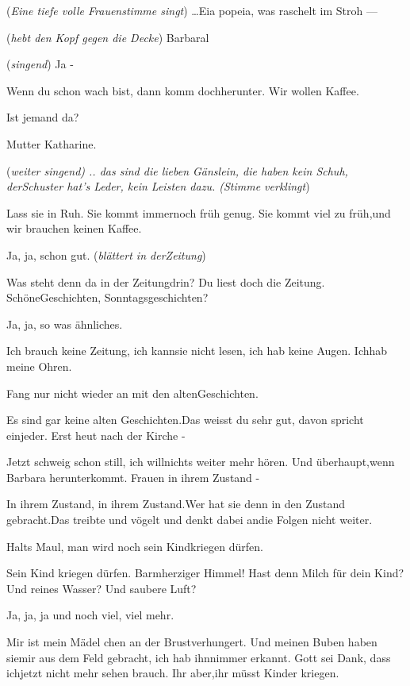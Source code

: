 \documentclass[
	final,
	a4paper,
	ngerman,
	mpinclude = true, %
	twoside = true,
	open = right,
	cleardoublepage = plain,
	DIV = 13,
	BCOR = 1cm,
	titlepage = firstiscover,
	]{scrbook}
\newcommand{\direction}[1]{(\textit{#1})}
\newcommand{\thecharacter}[1]{\textup{\textsc{#1}}\xspace}
\newcommand{\theBarbara}{\thecharacter{Barbara}}
\newcommand{\theJosef}{\thecharacter{Josef}}
\newcommand{\theKathrine}{\thecharacter{Kathrine}}
\newcommand{\character}[1]{\item[#1]}
\newcommand{\Barbara}{\character{\theBarbara}}
\newcommand{\Josef}{\character{\theJosef}}
\newcommand{\Kathrine}{\character{\theKathrine}}
\begin{document}
\begin{play}

\Barbara
\direction{Eine tiefe volle Frauenstimme singt} \ldots Eia popeia, was raschelt im Stroh ---

\Josef
\direction{hebt den Kopf gegen die Decke} Barbaral

\Barbara
\direction{singend} Ja -

\Josef
Wenn du schon wach bist, dann komm dochherunter. Wir wollen Kaffee.

\Barbara
Ist jemand da?

\Josef
Mutter Katharine.

\Barbara
\direction{weiter singend) .. das sind die lieben Gänslein, die haben kein Schuh, derSchuster hat's Leder, kein Leisten dazu. (Stimme verklingt}

\Kathrine
Lass sie in Ruh. Sie kommt immernoch früh genug. Sie kommt viel zu früh,und wir brauchen keinen Kaffee.

\Josef
Ja, ja, schon gut. \direction{blättert in derZeitung}

\Kathrine
Was steht denn da in der Zeitungdrin? Du liest doch die Zeitung. SchöneGeschichten, Sonntagsgeschichten?

\Josef
Ja, ja, so was ähnliches.

\Kathrine
Ich brauch keine Zeitung, ich kannsie nicht lesen, ich hab keine Augen. Ichhab meine Ohren.

\Josef
Fang nur nicht wieder an mit den altenGeschichten.

\Kathrine
Es sind gar keine alten Geschichten.Das weisst du sehr gut, davon spricht einjeder. Erst heut nach der Kirche -

\Josef
Jetzt schweig schon still, ich willnichts weiter mehr hören. Und überhaupt,wenn Barbara herunterkommt. Frauen in ihrem Zustand -

\Kathrine
In ihrem Zustand, in ihrem Zustand.Wer hat sie denn in den Zustand gebracht.Das treibte und vögelt und denkt dabei andie Folgen nicht weiter.

\Josef
Halts Maul, man wird noch sein Kindkriegen dürfen.

\Kathrine
Sein Kind kriegen dürfen. Barmherziger Himmel! Hast denn Milch für dein Kind?Und reines Wasser? Und saubere Luft?

\Josef
Ja, ja, ja und noch viel, viel mehr.

\Kathrine
Mir ist mein Mädel chen an der Brustverhungert. Und meinen Buben haben siemir aus dem Feld gebracht, ich hab ihnnimmer erkannt. Gott sei Dank, dass ichjetzt nicht mehr sehen brauch. Ihr aber,ihr müsst Kinder kriegen.


\end{play}
\end{document}
